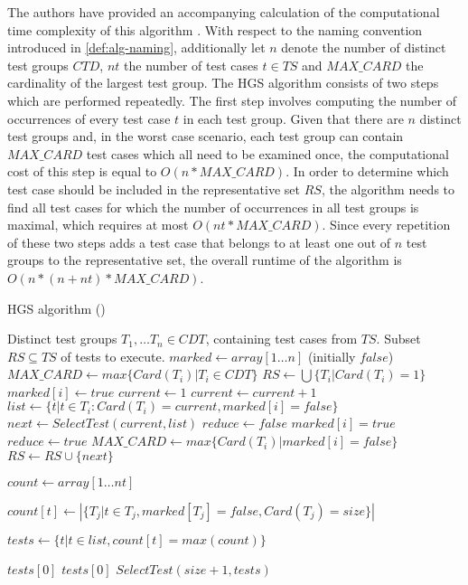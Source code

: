 \noindent The authors have provided an accompanying calculation of the computational time complexity of this algorithm \cite{hgs}. With respect to the naming convention introduced in \autoref{def:alg-naming}, additionally let $n$ denote the number of distinct test groups $CTD$, $nt$ the number of test cases $t \in TS$ and $MAX\_CARD$ the cardinality of the largest test group. The HGS algorithm consists of two steps which are performed repeatedly. The first step involves computing the number of occurrences of every test case $t$ in each test group. Given that there are $n$ distinct test groups and, in the worst case scenario, each test group can contain $MAX\_CARD$ test cases which all need to be examined once, the computational cost of this step is equal to $O(n * MAX\_CARD)$. In order to determine which test case should be included in the representative set $RS$, the algorithm needs to find all test cases for which the number of occurrences in all test groups is maximal, which requires at most $O(nt * MAX\_CARD)$. Since every repetition of these two steps adds a test case that belongs to at least one out of $n$ test groups to the representative set, the overall runtime of the algorithm is $O(n * (n + nt) * MAX\_CARD)$.
\begin{algorithm}[h!]
\caption{HGS algorithm (\cite{hgs})}
\label{alg:hgs}
\begin{algorithmic}[1]
	 Distinct test groups $T_1, \dots T_n \in CDT$, containing test cases from $TS$.
	 Subset $RS \subseteq TS$ of tests to execute.
	\State $marked \gets array[1 \dots n]$ (initially $false$)
	\State $MAX\_CARD \gets max \{Card(T_i) \vert T_i \in CDT\}$
	\State $RS \gets \bigcup \{ T_i \vert Card(T_i) = 1 \}$
		 $marked[i] \gets true$ \EndIf
	\EndFor
	\State $current \gets 1$
		\State $current \gets current + 1$
			\State $list \gets \{t \vert t \in T_i : Card(T_i) = current, marked[i] = false\}$
			\State $next \gets SelectTest(current, list)$
			\State $reduce \gets false$
					\State $marked[i] = true$
					 $reduce \gets true$ \EndIf
				\EndIf
			\EndFor
				\State $MAX\_CARD \gets max \{Card(T_i) \vert marked[i] = false\}$
			\EndIf
			\State $RS \gets RS \cup \{next\}$
		\EndWhile
	\EndWhile
	
		\State $count\gets array[1 \dots nt]$
		
			\State $count[t] \gets |\{T_j \vert t \in T_j, marked[T_j] = false, Card(T_j) = size\}|$
		\EndFor
		
		\State $tests \gets \{t \vert t \in list, count[t] = max(count) \}$
		
		 \Return $tests[0]$
		 \Return $tests[0]$
		\Else\mbox{} \Return $SelectTest(size+1, tests)$
		\EndIf
	\EndFunction
\end{algorithmic}
\end{algorithm}